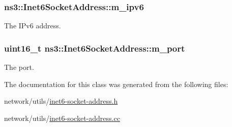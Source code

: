 \subsubsection[{\texorpdfstring{m\+\_\+ipv6}{m_ipv6}}]{ ns3\+::\+Inet6\+Socket\+Address\+::m\+\_\+ipv6\hspace{0.3cm}{\ttfamily [private]}}\hypertarget{classns3_1_1Inet6SocketAddress_ae9cdb1c6f2e612cb6ac97e17d6abb2b6}{}\label{classns3_1_1Inet6SocketAddress_ae9cdb1c6f2e612cb6ac97e17d6abb2b6}


The I\+Pv6 address. 

\subsubsection[{\texorpdfstring{m\+\_\+port}{m_port}}]{\setlength{\rightskip}{0pt plus 5cm}uint16\+\_\+t ns3\+::\+Inet6\+Socket\+Address\+::m\+\_\+port\hspace{0.3cm}{\ttfamily [private]}}\hypertarget{classns3_1_1Inet6SocketAddress_a5ae16cc59dc8e88a70a6bef74864b446}{}\label{classns3_1_1Inet6SocketAddress_a5ae16cc59dc8e88a70a6bef74864b446}


The port. 



The documentation for this class was generated from the following files\+:\begin{DoxyCompactItemize}
\item 
network/utils/\hyperlink{inet6-socket-address_8h}{inet6-\/socket-\/address.\+h}\item 
network/utils/\hyperlink{inet6-socket-address_8cc}{inet6-\/socket-\/address.\+cc}\end{DoxyCompactItemize}
